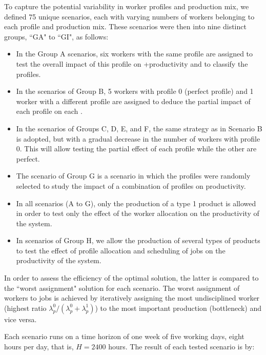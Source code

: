 \documentclass[review,12pt, 3p, times]{elsarticle}
\begin{document}
To capture the potential variability in worker profiles and production mix, we defined 75 unique scenarios, each with varying numbers of workers belonging to each profile and production mix. These scenarios were then  into nine distinct groups,  “GA" to “GI", as follows:
\begin{itemize}
    \item In the Group A scenarios, six workers with the same profile are assigned to test the overall impact of this profile on +productivity and to classify the profiles. 
    \item In the scenarios of Group B, 5 workers with profile 0 (perfect profile) and 1 worker with a different profile are assigned to deduce the partial impact of each profile on each .
    \item In the scenarios of Groups C, D, E, and F, the same strategy as in Scenario B is adopted, but with a gradual decrease in the number of workers with profile 0. This will allow testing the partial effect of each profile \deleted[]{,}{} while the other  are perfect. 
    \item The scenario of Group G is a scenario in which the profiles were randomly selected to study the impact of a combination of profiles on productivity.
    \item  In all scenarios (A to G), only the production of a type 1 product is allowed in order to test only the effect of the worker allocation on the productivity of the system.
    \item In scenarios of Group H, we allow the production of several types of products to test the effect of profile allocation and scheduling of jobs on the productivity of the system.  
\end{itemize}
					
In order to assess the efficiency of the optimal solution, the latter is compared to the “worst assignment" solution for each scenario. The worst assignment of workers to jobs is achieved by iteratively assigning the most undisciplined worker (highest ratio $\lambda^0_p/(\lambda^0_p+\lambda^1_p)$) to the most important production  (bottleneck) and vice versa.
					
Each scenario runs on a time horizon of one week of five working days, eight hours per day, that is, $H=2400$ hours. The result of each tested scenario is  by:
	
\end{document}
